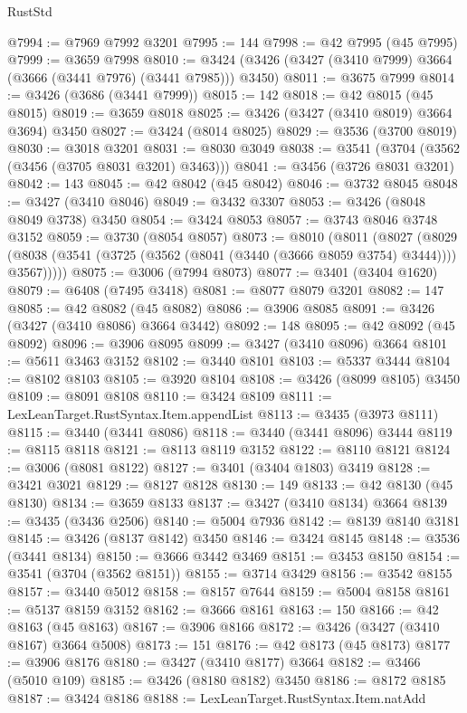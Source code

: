 \begin{lexlean}{RustStd}
\begin{coremodule}
@7994 := @7969 @7992 @3201
@7995 := 144
@7998 := @42 @7995 (@45 @7995)
@7999 := @3659 @7998
@8010 := @3424 (@3426 (@3427 (@3410 @7999) @3664 (@3666 (@3441 @7976) (@3441 @7985))) @3450)
@8011 := @3675 @7999
@8014 := @3426 (@3686 (@3441 @7999))
@8015 := 142
@8018 := @42 @8015 (@45 @8015)
@8019 := @3659 @8018
@8025 := @3426 (@3427 (@3410 @8019) @3664 @3694) @3450
@8027 := @3424 (@8014 @8025)
@8029 := @3536 (@3700 @8019)
@8030 := @3018 @3201
@8031 := @8030 @3049
@8038 := @3541 (@3704 (@3562 (@3456 (@3705 @8031 @3201) @3463)))
@8041 := @3456 (@3726 @8031 @3201)
@8042 := 143
@8045 := @42 @8042 (@45 @8042)
@8046 := @3732 @8045
@8048 := @3427 (@3410 @8046)
@8049 := @3432 @3307
@8053 := @3426 (@8048 @8049 @3738) @3450
@8054 := @3424 @8053
@8057 := @3743 @8046 @3748 @3152
@8059 := @3730 (@8054 @8057)
@8073 := @8010
    (@8011
      (@8027
        (@8029 (@8038 (@3541 (@3725 (@3562 (@8041 (@3440 (@3666 @8059 @3754) @3444)))) @3567)))))
@8075 := @3006 (@7994 @8073)
@8077 := @3401 (@3404 @1620)
@8079 := @6408 (@7495 @3418)
@8081 := @8077 @8079 @3201
@8082 := 147
@8085 := @42 @8082 (@45 @8082)
@8086 := @3906 @8085
@8091 := @3426 (@3427 (@3410 @8086) @3664 @3442)
@8092 := 148
@8095 := @42 @8092 (@45 @8092)
@8096 := @3906 @8095
@8099 := @3427 (@3410 @8096) @3664
@8101 := @5611 @3463 @3152
@8102 := @3440 @8101
@8103 := @5337 @3444
@8104 := @8102 @8103
@8105 := @3920 @8104
@8108 := @3426 (@8099 @8105) @3450
@8109 := @8091 @8108
@8110 := @3424 @8109
@8111 := LexLeanTarget.RustSyntax.Item.appendList
@8113 := @3435 (@3973 @8111)
@8115 := @3440 (@3441 @8086)
@8118 := @3440 (@3441 @8096) @3444
@8119 := @8115 @8118
@8121 := @8113 @8119 @3152
@8122 := @8110 @8121
@8124 := @3006 (@8081 @8122)
@8127 := @3401 (@3404 @1803) @3419
@8128 := @3421 @3021
@8129 := @8127 @8128
@8130 := 149
@8133 := @42 @8130 (@45 @8130)
@8134 := @3659 @8133
@8137 := @3427 (@3410 @8134) @3664
@8139 := @3435 (@3436 @2506)
@8140 := @5004 @7936
@8142 := @8139 @8140 @3181
@8145 := @3426 (@8137 @8142) @3450
@8146 := @3424 @8145
@8148 := @3536 (@3441 @8134)
@8150 := @3666 @3442 @3469
@8151 := @3453 @8150
@8154 := @3541 (@3704 (@3562 @8151))
@8155 := @3714 @3429
@8156 := @3542 @8155
@8157 := @3440 @5012
@8158 := @8157 @7644
@8159 := @5004 @8158
@8161 := @5137 @8159 @3152
@8162 := @3666 @8161
@8163 := 150
@8166 := @42 @8163 (@45 @8163)
@8167 := @3906 @8166
@8172 := @3426 (@3427 (@3410 @8167) @3664 @5008)
@8173 := 151
@8176 := @42 @8173 (@45 @8173)
@8177 := @3906 @8176
@8180 := @3427 (@3410 @8177) @3664
@8182 := @3466 (@5010 @109)
@8185 := @3426 (@8180 @8182) @3450
@8186 := @8172 @8185
@8187 := @3424 @8186
@8188 := LexLeanTarget.RustSyntax.Item.natAdd

\end{coremodule}
\end{lexlean}
